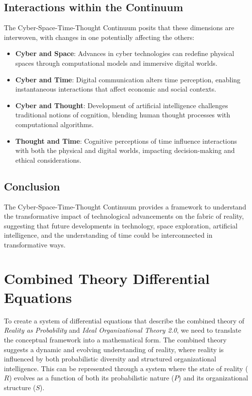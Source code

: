 \documentclass{article}
\begin{document}
\subsection{Interactions within the Continuum}
The Cyber-Space-Time-Thought Continuum posits that these dimensions are interwoven, with changes in one potentially affecting the others:

\begin{itemize}
    \item \textbf{Cyber and Space}: Advances in cyber technologies can redefine physical spaces through computational models and immersive digital worlds.
    \item \textbf{Cyber and Time}: Digital communication alters time perception, enabling instantaneous interactions that affect economic and social contexts.
    \item \textbf{Cyber and Thought}: Development of artificial intelligence challenges traditional notions of cognition, blending human thought processes with computational algorithms.
    \item \textbf{Thought and Time}: Cognitive perceptions of time influence interactions with both the physical and digital worlds, impacting decision-making and ethical considerations.
\end{itemize}

\subsection{Conclusion}
The Cyber-Space-Time-Thought Continuum provides a framework to understand the transformative impact of technological advancements on the fabric of reality, suggesting that future developments in technology, space exploration, artificial intelligence, and the understanding of time could be interconnected in transformative ways.
\section*{Combined Theory Differential Equations}

To create a system of differential equations that describe the combined theory of \textit{Reality as Probability} and \textit{Ideal Organizational Theory 2.0}, we need to translate the conceptual framework into a mathematical form. The combined theory suggests a dynamic and evolving understanding of reality, where reality is influenced by both probabilistic diversity and structured organizational intelligence. This can be represented through a system where the state of reality (\(R\)) evolves as a function of both its probabilistic nature (\(P\)) and its organizational structure (\(S\)).
\end{document}
